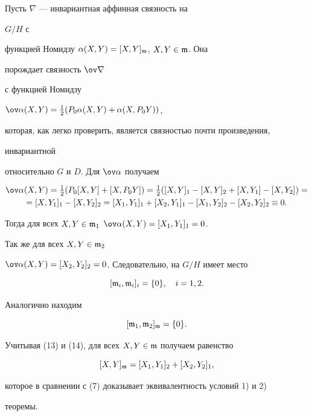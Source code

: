 \begin{pf} Пусть $\nabla$ --- инвариантная аффинная связность на 


$G/H$ с 


функцией Номидзу $\alpha(X,Y)=[X,Y]_{\frak m}$, $X,Y\in\frak m$. Она 


порождает связность $\ov\nabla$ 


с функцией Номидзу


$\ov\alpha(X,Y)=\frac{1}{2}(P_0\alpha(X,Y)+\alpha(X,P_0Y))$, 


которая, как легко проверить, является связностью почти произведения, 


инвариантной 


относительно $G$ и $D$. Для $\ov\alpha$ получаем 


\begin{multline*} 


\ov\alpha(X,Y)=\tfrac{1}{2}(P_0[X,Y]+[X,P_0Y])=\tfrac{1}{2} 


([X,Y]_1-[X,Y]_2+[X,Y_1]-[X,Y_2])= \\ 


=[X,Y_1]_1-[X,Y_2]_2=[X_1,Y_1]_1+[X_2,Y_1]_1- 


[X_1,Y_2]_2-[X_2,Y_2]_2\equiv 0. 


\end{multline*} 


Тогда для всех $X,Y\in\frak m_1$\; $\ov\alpha(X,Y)=[X_1,Y_1]_1=0$. 


Так же для всех $X,Y\in\frak m_2$\; 


$\ov\alpha(X,Y)=[X_2,Y_2]_2=0$. Следовательно, на $G/H$ имеет место 


\begin{equation} 


[\frak m_i,\frak m_i]_i=\{0\},\quad i=1,2. 


\end{equation} 


Аналогично находим 


\begin{equation} 


[\frak m_1,\frak m_2]_{\frak m}=\{0\}. 


\end{equation} 


Учитывая (13) и (14), для всех $X,Y\in\frak m$ получаем равенство 


\begin{equation} 


[X,Y]_{\frak m}=[X_1,Y_1]_2+[X_2,Y_2]_1, 


\end{equation} 


которое в сравнении с (7) доказывает эквивалентность условий 1) и 2) 


теоремы. 


\end{pf} 


